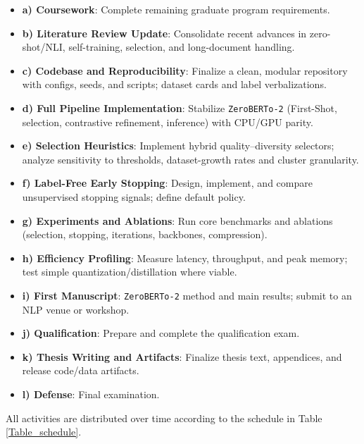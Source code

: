 \documentclass[]{politex-xico}
\begin{document}
\begin{itemize}
\item \textbf{a) Coursework}: Complete remaining graduate program requirements.
\item \textbf{b) Literature Review Update}: Consolidate recent advances in zero-shot/NLI, self-training, selection, and long-document handling.
\item \textbf{c) Codebase and Reproducibility}: Finalize a clean, modular repository with configs, seeds, and scripts; dataset cards and label verbalizations.
\item \textbf{d) Full Pipeline Implementation}: Stabilize \texttt{ZeroBERTo-2} (First-Shot, selection, contrastive refinement, inference) with CPU/GPU parity.
\item \textbf{e) Selection Heuristics}: Implement hybrid quality–diversity selectors; analyze sensitivity to thresholds, dataset-growth rates and cluster granularity.
\item \textbf{f) Label-Free Early Stopping}: Design, implement, and compare unsupervised stopping signals; define default policy.
\item \textbf{g) Experiments and Ablations}: Run core benchmarks and ablations (selection, stopping, iterations, backbones, compression).
\item \textbf{h) Efficiency Profiling}: Measure latency, throughput, and peak memory; test simple quantization/distillation where viable.
\item \textbf{i) First Manuscript}: \texttt{ZeroBERTo-2} method and main results; submit to an NLP venue or workshop.
\item \textbf{j) Qualification}: Prepare and complete the qualification exam.
\item \textbf{k) Thesis Writing and Artifacts}: Finalize thesis text, appendices, and release code/data artifacts.
\item \textbf{l) Defense}: Final examination.
\end{itemize}

All activities are distributed over time according to the schedule in Table \ref{Table_schedule}.
\end{document}
